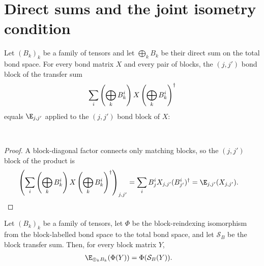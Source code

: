 \section{Direct sums and the joint isometry condition}

\begin{lemma}%
    \label{lem:block_diagonal_transfer_sum_to_block}
    \leanok
    Let $(B_k)_k$ be a family of tensors and let $\bigoplus_k B_k$ be their
    direct sum on the total bond space. For every bond matrix $X$ and every pair
    of blocks, the $(j,j')$ bond block of the transfer sum
    \begin{align}
        \sum_i \left(\bigoplus_k B_k^i\right)X
        \left(\bigoplus_k B_k^i\right)^\dagger
        \notag
    \end{align}
    equals $\E_{j,j'}$ applied to the $(j,j')$ bond block of $X$:
    \begin{center}
        \tenkzkernel
        \begin{tenkz}[rows={ket,bra}, cols=1, west=open,
                east={cup=$X_{j,j'}$}]
             \\
        \end{tenkz}
    \end{center}
\end{lemma}
\begin{proof}\leanok
    A block-diagonal factor connects only matching blocks, so the $(j,j')$ block
    of the product is
    \begin{align}
        \left(\sum_i \left(\bigoplus_k B_k^i\right)X
        \left(\bigoplus_k B_k^i\right)^\dagger\right)_{j,j'}
         & = \sum_i B_j^i X_{j,j'}(B_{j'}^i)^\dagger
        = \E_{j,j'}(X_{j,j'}).
        \notag
    \end{align}
\end{proof}

\begin{lemma}%
    \label{thm:direct_sum_transfer_reindex}
    \leanok
    Let $(B_k)_k$ be a family of tensors, let $\Phi$ be the block-reindexing
    isomorphism from the block-labelled bond space to the total bond space,
    and let $\mathcal S_B$ be the block transfer sum. Then, for every block
    matrix $Y$,
    \begin{align}
        \E_{\oplus_k B_k}(\Phi(Y)) & =\Phi(\mathcal S_B(Y)).
        \notag
    \end{align}
\end{lemma}

